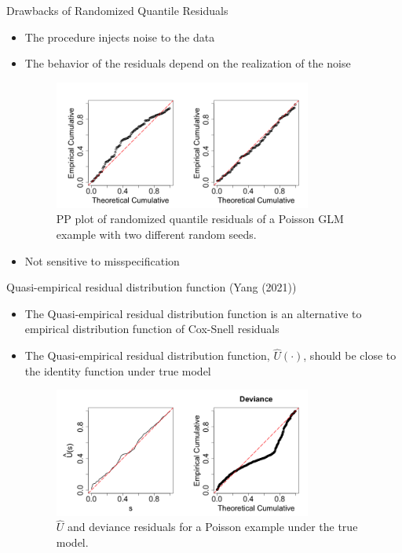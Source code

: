 \documentclass[
  ignorenonframetext,
]{beamer}
\begin{document}
\begin{frame}{Drawbacks of Randomized Quantile Residuals}
\protect\hypertarget{drawbacks-of-randomized-quantile-residuals}{}
\begin{itemize}
    \item The procedure injects noise to the data
    \item The behavior of the residuals depend on the realization of the noise
\vspace{-0.2in}
    \begin{figure}[h]
    \includegraphics[width=0.8\textwidth]{figures/randomizeseeds}
    \caption{PP plot of randomized quantile  residuals of a Poisson GLM example with two different random seeds. }
\end{figure}
    \item Not sensitive to misspecification
\end{itemize}
\end{frame}

\begin{frame}{Quasi-empirical residual distribution function (Yang
(2021))}
\protect\hypertarget{quasi-empirical-residual-distribution-function-yang2021assessment}{}
\begin{itemize}
\item  The   Quasi-empirical residual distribution function is an alternative to empirical  distribution function of Cox-Snell residuals
\item    The   Quasi-empirical residual distribution function, $\hat{U}(\cdot)$,
                        should be close to the identity function under true model 
    \begin{figure}[h]
        \includegraphics[width=0.8\textwidth]{figures/quickexample}
        \vspace{-0.1in}
        \caption{$\hat{U}$ and deviance residuals for  a Poisson example under the true model. }
    \end{figure}

\end{itemize}
\end{frame}
\end{document}
